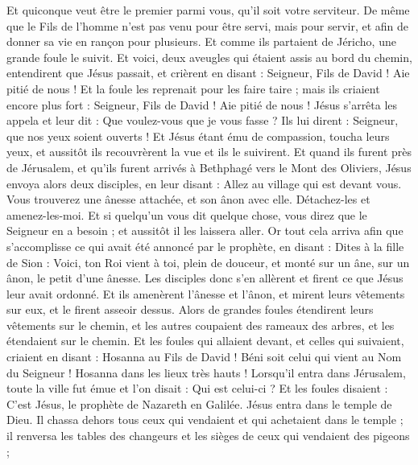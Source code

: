 \begin{multicols}{2}
Et quiconque veut être le premier parmi vous, qu'il soit votre serviteur.
De même que le Fils de l'homme n'est pas venu pour être servi, mais pour servir, et afin de donner sa vie en rançon pour plusieurs.
Et comme ils partaient de Jéricho, une grande foule le suivit.
Et voici, deux aveugles qui étaient assis au bord du chemin, entendirent que Jésus passait, et crièrent en disant : Seigneur, Fils de David ! Aie pitié de nous !
Et la foule les reprenait pour les faire taire ; mais ils criaient encore plus fort : Seigneur, Fils de David ! Aie pitié de nous !
Jésus s'arrêta les appela et leur dit : Que voulez-vous que je vous fasse ?
Ils lui dirent : Seigneur, que nos yeux soient ouverts !
Et Jésus étant ému de compassion, toucha leurs yeux, et aussitôt ils recouvrèrent la vue et ils le suivirent.
\VerseOne{}Et quand ils furent près de Jérusalem, et qu'ils furent arrivés à Bethphagé vers le Mont des Oliviers, Jésus envoya alors deux disciples,
en leur disant : Allez au village qui est devant vous. Vous trouverez une ânesse attachée, et son ânon avec elle. Détachez-les et amenez-les-moi.
Et si quelqu'un vous dit quelque chose, vous direz que le Seigneur en a besoin ; et aussitôt il les laissera aller.
Or tout cela arriva afin que s'accomplisse ce qui avait été annoncé par le prophète, en disant :
Dites à la fille de Sion : Voici, ton Roi vient à toi, plein de douceur, et monté sur un âne, sur un ânon, le petit d'une ânesse.
Les disciples donc s'en allèrent et firent ce que Jésus leur avait ordonné.
Et ils amenèrent l'ânesse et l'ânon, et mirent leurs vêtements sur eux, et le firent asseoir dessus.
Alors de grandes foules étendirent leurs vêtements sur le chemin, et les autres coupaient des rameaux des arbres, et les étendaient sur le chemin.
Et les foules qui allaient devant, et celles qui suivaient, criaient en disant : Hosanna au Fils de David ! Béni soit celui qui vient au Nom du Seigneur ! Hosanna dans les lieux très hauts !
Lorsqu'il entra dans Jérusalem, toute la ville fut émue et l'on disait : Qui est celui-ci ?
Et les foules disaient : C'est Jésus, le prophète de Nazareth en Galilée.
Jésus entra dans le temple de Dieu. Il chassa dehors tous ceux qui vendaient et qui achetaient dans le temple ; il renversa les tables des changeurs et les sièges de ceux qui vendaient des pigeons ;

\end{multicols}
